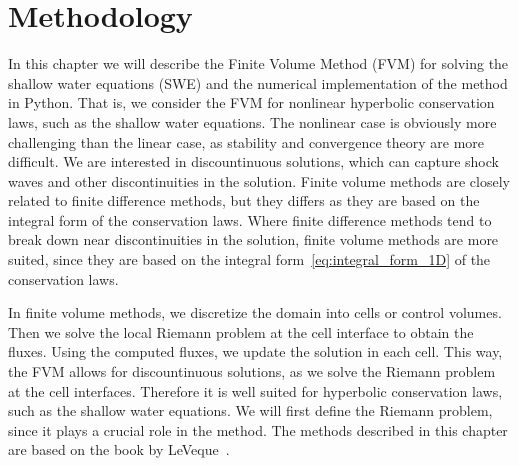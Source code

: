 \chapter{Methodology}
In this chapter we will describe the Finite Volume Method (FVM) for solving the shallow water equations (SWE) and the numerical implementation of the method in Python.
That is, we consider the FVM for nonlinear hyperbolic conservation laws, such as the shallow water equations.
The nonlinear case is obviously more challenging than the linear case, as stability and convergence theory are more difficult.
We are interested in discountinuous solutions, which can capture shock waves and other discontinuities in the solution.
Finite volume methods are closely related to finite difference methods, but they differs as they are based on the integral form of the conservation laws.
Where finite difference methods tend to break down near discontinuities in the solution, finite volume methods are more suited, since they are based on the integral form~\eqref{eq:integral_form_1D} of the conservation laws.

In finite volume methods, we discretize the domain into cells or control volumes.
Then we solve the local Riemann problem at the cell interface to obtain the fluxes.
Using the computed fluxes, we update the solution in each cell.
This way, the FVM allows for discountinuous solutions, as we solve the Riemann problem at the cell interfaces.
Therefore it is well suited for hyperbolic conservation laws, such as the shallow water equations.
We will first define the Riemann problem, since it plays a crucial role in the method.
The methods described in this chapter are based on the book by LeVeque~\cite{LeVeque2002}.










